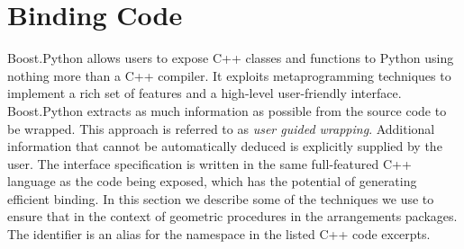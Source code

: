 \section{Binding Code}
\label{sec:code}
Boost.Python allows users to expose C++ classes and functions to Python using nothing more than a C++ compiler. It exploits metaprogramming techniques to implement a rich set of features and a high-level user-friendly interface. Boost.Python extracts as much information as possible from the source code to be wrapped. This approach is referred to as \emph{user guided wrapping}. Additional information that cannot be automatically deduced is explicitly supplied by the user. The interface specification is written in the same full-featured C++ language as the code being exposed, which has the potential of generating efficient binding. In this section we describe some of the techniques we use to ensure that in the context of geometric procedures in the \cgal{} arrangements packages. The identifier  is an alias for the namespace  in the listed C++ code excerpts.

